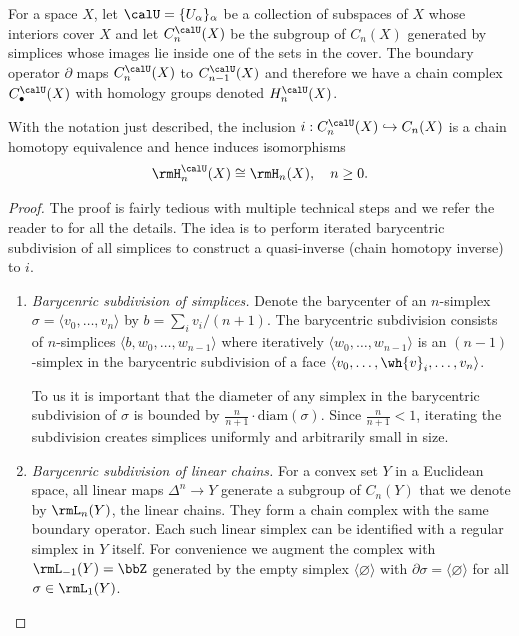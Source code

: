 For a space $X$, let $\calU=\{U_\alpha\}_\alpha$ be a collection of subspaces of $X$ whose interiors cover $X$ and let $C_n^\calU(X)$ be the subgroup of $C_n(X)$ generated by simplices whose images lie inside one of the sets in the cover. The boundary operator $\partial$ maps $C^\calU_n(X)$ to $C^\calU_{n-1}(X)$ and therefore we have a chain complex $C_\bullet^\calU(X)$ with homology groups denoted $H^\calU_n(X)$.


\begin{prop}\label{thm 2.21 Hatcher}
    With the notation just described, the inclusion $i:C_n^\calU(X)\hookrightarrow C_n(X)$ is a chain homotopy equivalence and hence induces isomorphisms
    \[\rmH_n^\calU(X)\cong \rmH_n(X),\quad n\geq 0.\]
\end{prop}
\begin{proof}
     The proof is fairly tedious with multiple technical steps and we refer the reader to \cite[Thm. 2.21]{Hatcher} for all the details. The idea is to perform iterated barycentric subdivision of all simplices to construct a quasi-inverse (chain homotopy inverse) to $i$. 
     
     \begin{enumerate}
         \item \emph{Barycenric subdivision of simplices.} Denote the barycenter of an $n$-simplex $\sigma=\langle v_0,\ldots,v_n\rangle$ by  $b=\sum_i v_i/(n+1)$. The barycentric subdivision consists of $n$-simplices $\langle b,w_0,\ldots,w_{n-1}
         \rangle$ where iteratively $\langle w_0,\ldots,w_{n-1}\rangle$ is an $(n-1)$-simplex in the barycentric subdivision of a face $\langle v_0,\ldots,\wh{v}_i,\ldots,v_n\rangle$.
         
         To us it is important that the diameter of any simplex in the barycentric subdivision of $\sigma$ is bounded by $\frac{n}{n+1}\cdot \text{diam}(\sigma)$. Since $\frac{n}{n+1}<1$, iterating the subdivision creates simplices uniformly and arbitrarily small in size.
         
         \item \emph{Barycenric subdivision of linear chains.} For a convex set $Y$ in a Euclidean space, all linear maps $\Delta^n\to Y$ generate a subgroup of $C_n(Y)$ that we denote by $\rmL_n(Y)$, the linear chains. They form a chain complex with the same boundary operator. Each such linear simplex can be identified with a regular simplex in $Y$ itself.  For convenience we augment the complex with $\rmL_{-1}(Y)=\bbZ$ generated by the empty simplex $\langle \varnothing \rangle$ with $\partial \sigma=\langle \varnothing \rangle$ for all $\sigma\in \rmL_1(Y)$.
         

\end{enumerate}
\end{proof}
